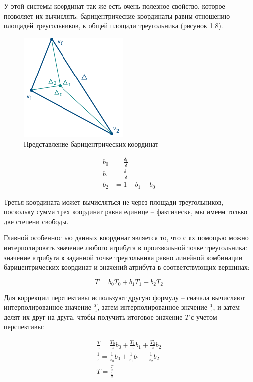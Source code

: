 \documentclass[12pt,a4paper,oneside]{report}
\begin{document}
	
	 У этой системы координат так же есть очень полезное свойство, которое позволяет их вычислять: барицентрические координаты равны отношению площадей треугольников, к общей площади треугольника (рисунок 1.8).
	\begin{figure}[h]
		\centering
		\includegraphics[scale=0.7]{bary}
		\caption{Представление барицентрических координат}
	\end{figure}

	\begin{equation}
	\begin{aligned}
	b_0 &= \frac{\delta_0}{\delta}\\
	b_1 &= \frac{\delta_1}{\delta}\\
	b_2 &= 1 - b_1 - b_0
	\end{aligned}
	\end{equation}
	
	 Третья координата может вычисляться не через площади треугольников, поскольку сумма трех координат равна единице -- фактически, мы имеем только две степени свободы.
	
	 Главной особенностью данных координат является то, что с их помощью можно интерполировать значение любого атрибута в произвольной точке треугольника: значение атрибута в заданной точке треугольника равно линейной комбинации барицентрических координат и значений атрибута в соответствующих вершинах:
	
	\begin{equation}
	T = b_0 T_0 + b_1 T_1 + b_2 T_2
	\end{equation}
	
	 Для коррекции перспективы используют другую формулу -- сначала вычисляют интерполированное значение $\frac{T}{z}$, затем интерполированное значение $\frac{1}{z}$, и затем делят их друг на друга, чтобы получить итоговое значение $T$ с учетом перспективы:
	
	\begin{equation}
	\begin{gathered}
	\frac{T}{z} = \frac{T_0}{z}  b_0 + \frac{T_1}{z}  b_1 + \frac{T_2}{z}  b_2\\
	\frac{1}{z} = \frac{1}{z_0}  b_0 + \frac{1}{z_1}  b_1 + \frac{1}{z_2}  b_2\\
	T = \frac{\frac{T}{z}}{\frac{1}{z}}
	\end{gathered}
	\end{equation}
	
\end{document}
